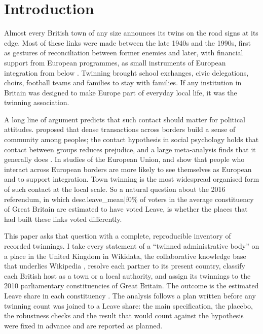 \documentclass[11pt,a4paper]{article}
\begin{document}
\section{Introduction}
Almost every British town of any size announces its twins on the road signs at its edge. Most of these links were made between the late 1940s and the 1990s, first as gestures of reconciliation between former enemies and later, with financial support from European programmes, as small instruments of European integration from below \citep{vion2002,clarke2010,falkenhain2012}. Twinning brought school exchanges, civic delegations, choirs, football teams and families to stay with families. If any institution in Britain was designed to make Europe part of everyday local life, it was the twinning association.

A long line of argument predicts that such contact should matter for political attitudes. \citet{deutsch1957} proposed that dense transactions across borders build a sense of community among peoples; the contact hypothesis in social psychology holds that contact between groups reduces prejudice, and a large meta-analysis finds that it generally does \citep{pettigrew2006}. In studies of the European Union, \citet{fligstein2008} and \citet{kuhn2011,kuhn2015} show that people who interact across European borders are more likely to see themselves as European and to support integration. Town twinning is the most widespread organised form of such contact at the local scale. So a natural question about the 2016 referendum, in which {{desc.leave_mean|f0}}\% of voters in the average constituency of Great Britain are estimated to have voted Leave, is whether the places that had built these links voted differently.

This paper asks that question with a complete, reproducible inventory of recorded twinnings. I take every statement of a ``twinned administrative body'' on a place in the United Kingdom in Wikidata, the collaborative knowledge base that underlies Wikipedia \citep{vrandecic2014}, resolve each partner to its present country, classify each British host as a town or a local authority, and assign its twinnings to the 2010 parliamentary constituencies of Great Britain. The outcome is the estimated Leave share in each constituency \citep{hanretty2017}. The analysis follows a plan written before any twinning count was joined to a Leave share: the main specification, the placebo, the robustness checks and the result that would count against the hypothesis were fixed in advance and are reported as planned.
\end{document}
